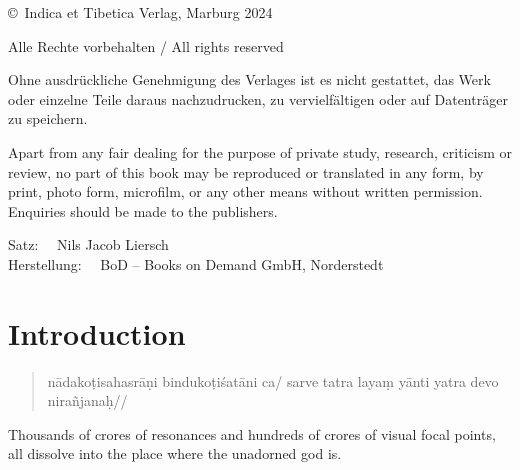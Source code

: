 \vskip 1cm

\noindent
\copyright\ Indica et Tibetica Verlag, Marburg 2024

\medskip

\noindent
Alle Rechte vorbehalten / All rights reserved

\medskip

\noindent
Ohne ausdrückliche Genehmigung des Verlages ist es nicht gestattet, das Werk oder einzelne Teile
daraus nachzudrucken, zu vervielfältigen oder auf Datenträger zu speichern.

\smallskip

\noindent
Apart from any fair dealing for the purpose of private study, research, criticism or review, no
part of this book may be reproduced or translated in any form, by print, photo form, microfilm, or
any other means without written permission. Enquiries should be made to the publishers.

\bigskip

\noindent
Satz: \ \ Nils Jacob Liersch \\
Herstellung: \ \ BoD – Books on Demand GmbH, Norderstedt  \\

\bigskip

\noindent

\normalsize

\newpage

\clearpage
\tableofcontents
\addtocounter{page}{-1}
\thispagestyle{empty}
\clearpage

\chapter{Introduction}
\mainmatter

\begin{quote}
nādakoṭisahasrāṇi bindukoṭiśatāni ca/
sarve tatra layaṃ yānti yatra devo nirañjanaḥ//
\end{quote}

Thousands of crores of resonances and hundreds of crores of visual focal points, all dissolve into the place where the unadorned god is.


